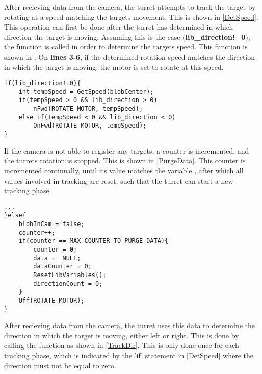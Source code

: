 After recieving data from the camera, the turret attempts to track the target by
rotating at a speed matching the targets movement. This is shown in
\autoref{DetSpeed}. This operation can first be done after the turret has
determined in which direction the target is moving. Assuming this is the case
(\textbf{lib\_direction!=0}), the  function is called in order
to determine the targets speed. This function is shown in .
On \textbf{lines 3-6}, if the determined rotation speed matches the direction in
which the target is moving, the motor is set to rotate at this speed.\nl

\begin{minipage}[H]{\linewidth}
\begin{lstlisting}[caption = Determine the targets speed at rotate to match it, label = DetSpeed] 
if(lib_direction!=0){
	int tempSpeed = GetSpeed(blobCenter);
	if(tempSpeed > 0 && lib_direction > 0)
		nFwd(ROTATE_MOTOR, tempSpeed);
	else if(tempSpeed < 0 && lib_direction < 0)
		OnFwd(ROTATE_MOTOR, tempSpeed);
}
\end{lstlisting}
\end{minipage}

If the camera is not able to register any targets, a counter is incremented, and
the turrets rotation is stopped. This is shown in \autoref{PurgeData}. This
counter is incremented continually, until its value matches the variable
, after which all values involved
in tracking are reset, such that the turret can start a new tracking phase.\nl

\begin{minipage}[H]{\linewidth}
\begin{lstlisting}[caption = Reset data and turn off motor is no targets are found., label = PurgeData] 
...
}else{
	blobInCam = false;
    counter++;
    if(counter == MAX_COUNTER_TO_PURGE_DATA){
    	counter = 0;
        data =  NULL;
        dataCounter = 0;
        ResetLibVariables();
        directionCount = 0;
    }
    Off(ROTATE_MOTOR);
}
\end{lstlisting}
\end{minipage}

After recieving data from the camera, the turret uses this data to determine the
direction in which the target is moving, either left or right. This is done by
calling the  function as shown in
\autoref{TrackDir}. This is only done once for each tracking phase, which is
indicated by the 'if' statement in \autoref{DetSpeed} where the direction
must not be equal to zero.\nl

